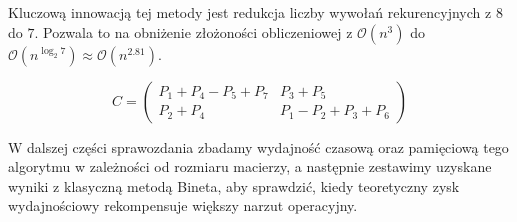 \documentclass{article}
\begin{document}
Kluczową innowacją tej metody jest redukcja liczby wywołań rekurencyjnych z $8$ do $7$. Pozwala to na obniżenie złożoności obliczeniowej z $\mathcal{O}(n^3)$ do $\mathcal{O}(n^{\log_2 7}) \approx \mathcal{O}(n^{2.81})$.

\[
\renewcommand{\arraystretch}{1.5}
C = \begin{pmatrix} 
P_1 + P_4 - P_5 + P_7 & P_3 + P_5 \\ 
P_2 + P_4 & P_1 - P_2 + P_3 + P_6 
\end{pmatrix}
\]

W dalszej części sprawozdania zbadamy wydajność czasową oraz pamięciową tego algorytmu w zależności od rozmiaru macierzy, a następnie zestawimy uzyskane wyniki z klasyczną metodą Bineta, aby sprawdzić, kiedy teoretyczny zysk wydajnościowy rekompensuje większy narzut operacyjny.
\end{document}
